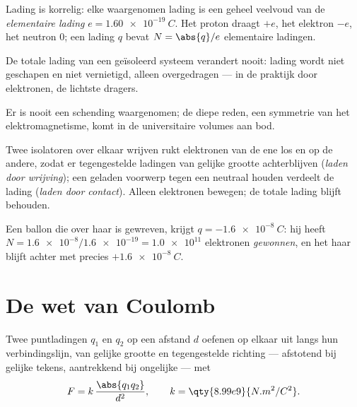 \begin{definition}\label{def:g11:fundamental-interactions:elementary}
Lading is korrelig: elke waargenomen lading is een geheel veelvoud van de
\emph{elementaire lading}
$e = \qty{1.60e-19}{C}$. Het proton draagt $+e$, het elektron $-e$, het
neutron $0$; een lading $q$ bevat $N = \abs{q}/e$ elementaire ladingen.
\end{definition}

\begin{proposition}\label{prop:g11:fundamental-interactions:conservation}
De totale lading van een geïsoleerd systeem verandert nooit: lading wordt
niet geschapen en niet vernietigd, alleen overgedragen --- in de praktijk
door elektronen, de lichtste dragers.
\end{proposition}
\admitted

\begin{remark}\label{rem:g11:fundamental-interactions:conservation}
Er is nooit een schending waargenomen; de diepe reden, een symmetrie van
het elektromagnetisme, komt in de universitaire volumes aan bod.
\end{remark}

\begin{definition}\label{def:g11:fundamental-interactions:charging}
Twee isolatoren over elkaar wrijven rukt elektronen van de ene los en op
de andere, zodat er tegengestelde ladingen van gelijke grootte
achterblijven (\emph{laden door wrijving});
een geladen voorwerp tegen een neutraal houden verdeelt de lading
(\emph{laden door contact}). Alleen elektronen
bewegen; de totale lading blijft behouden.
\end{definition}

\begin{example}\label{ex:g11:fundamental-interactions:balloon}
Een ballon die over haar is gewreven, krijgt $q = \qty{-1.6e-8}{C}$: hij
heeft $N = \num{1.6e-8} / \num{1.6e-19} = \num{1.0e11}$ elektronen
\emph{gewonnen}, en het haar blijft achter met precies
$+\qty{1.6e-8}{C}$.
\end{example}

\section{De wet van Coulomb}

\begin{theorem}\label{thm:g11:fundamental-interactions:coulomb}
Twee puntladingen $q_1$ en $q_2$ op een afstand $d$ oefenen op elkaar
 uit langs hun verbindingslijn, van gelijke grootte en
tegengestelde richting --- afstotend bij gelijke tekens, aantrekkend bij
ongelijke --- met
\[
F = k\,\frac{\abs{q_1 q_2}}{d^{2}},
\qquad k = \qty{8.99e9}{N.m^2/C^2}.
\]
\end{theorem}
\admitted

